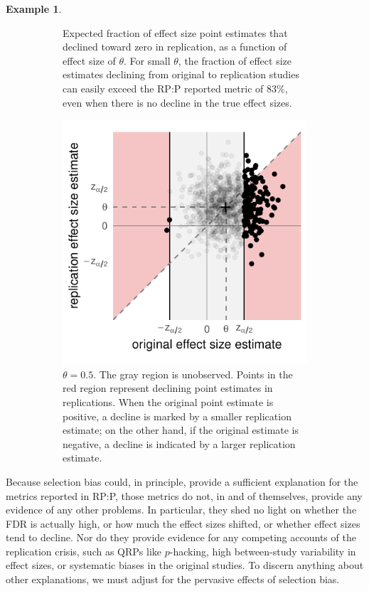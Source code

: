 \documentclass[11pt]{article}
\theoremstyle{definition}
\newtheorem{example}{Example}
\theoremstyle{custom}
\begin{document}
\begin{example}
\begin{figure}[htbp]
\begin{subfigure}[t]{0.59\hsize}
	      \caption{Expected fraction of effect size point estimates that declined toward zero in replication, as a function of effect size of $\theta$. For small $\theta$, the fraction of effect size estimates declining from original to replication studies can easily exceed the RP:P reported metric of $83\%$, even when there is no decline in the true effect sizes.}
	    \label{fig:naive-decline-func}
	    \end{subfigure}
	    \hfill
	    \begin{subfigure}[t]{0.39\hsize}
	      \centering
	      \includegraphics[width=\hsize]{naive-decline-theta1}
	      \caption{$\theta = 0.5$. The gray region is unobserved. Points in the red region represent declining point estimates in replications. When the original point estimate is positive, a decline is marked by a smaller replication estimate; on the other hand, if the original estimate is negative, a decline is indicated by a larger replication estimate.}
	    \label{fig:naive-ci-theta03}
	    \end{subfigure}
	    \caption{}
	  \label{fig:naive-decline}
	  \end{figure}
  \end{example}

  Because selection bias could, in principle, provide a sufficient explanation for the metrics reported in RP:P, those metrics do not, in and of themselves, provide any evidence of any other problems. In particular, they shed no light on whether the FDR is actually high, or how much the effect sizes shifted, or whether effect sizes tend to decline. Nor do they provide evidence for any competing accounts of the replication crisis, such as QRPs like $p$-hacking, high between-study variability in effect sizes, or systematic biases in the original studies. To discern anything about other explanations, we must adjust for the pervasive effects of selection bias.
\end{document}
